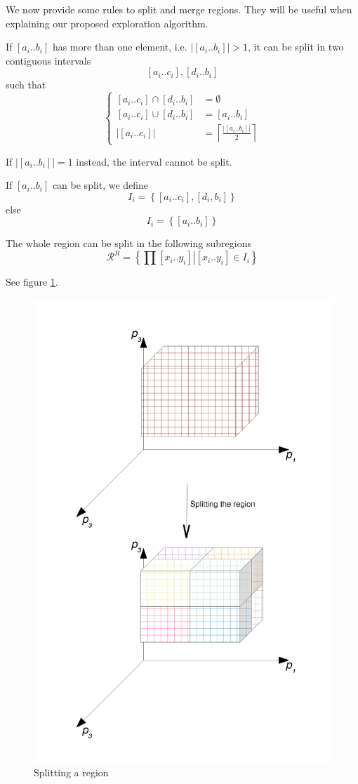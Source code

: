 We now provide some rules to split and merge regions. They will be
useful when explaining our proposed exploration algorithm.
\begin{definition}
\label{pers02.def:Splitting-a-region}
If $\left[a_{i}..b_{i}\right]$ has more than one element, i.e. $\left|\left[a_{i}..b_{i}\right]\right|>1$,
it can be split in two contiguous intervals
\[
\left[a_{i}..c_{i}\right],\left[d_{i}..b_{i}\right]
\]
 such that
\[
\begin{cases}
\left[a_{i}..c_{i}\right]\cap\left[d_{i}..b_{i}\right] & =\emptyset\\
\left[a_{i}..c_{i}\right]\cup\left[d_{i}..b_{i}\right] & =\left[a_{i}..b_{i}\right]\\
\left|\left[a_{i}..c_{i}\right]\right| & =\left\lceil \frac{\left|\left[a_{i}..b_{i}\right]\right|}{2}\right\rceil 
\end{cases}
\]


If $\left|\left[a_{i}..b_{i}\right]\right|=1$ instead, the interval
cannot be split. 

If $\left[a_{i}..b_{i}\right]$ can be split, we define
\[
I_{i}=\left\{ \left[a_{i}..c_{i}\right],\left[d_{i},b_{i}\right]\right\} 
\]
 else
\[
I_{i}=\left\{ \left[a_{i}..b_{i}\right]\right\} 
\]


The whole region can be split in the following subregions
\[
\mathcal{R}^{R}=\left\{ \left.\prod\left[x_{i}..y_{i}\right]\right|\left[x_{i}..y_{i}\right]\in I_{i}\right\} 
\]


See figure \ref{pers02.fig:Splitting-a-region}.

\begin{figure}[h]
\includegraphics[width=0.5\columnwidth]{img/splitting_the_region}

\caption{\label{pers02.fig:Splitting-a-region}Splitting a region}


\end{figure}

\end{definition}


